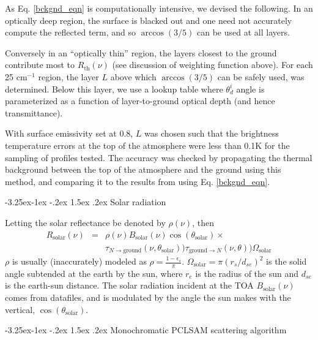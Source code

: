 \documentclass[11pt]{article}
\makeatletter
\newcommand{\wn}{cm$^{-1}$\xspace}
\renewcommand{\subsection}{\@startsection{subsection}{2}{\z@}%
                                     {-3.25ex\@plus -1ex \@minus -.2ex}%
                                     {1.5ex \@plus .2ex}%
                                     {\reset@font\normalsize\bfseries}}
\makeatother
\begin{document}
As Eq. \ref{bckgnd_eqn} is computationally intensive, we devised the
following.  In an optically deep region, the surface is blacked out
and one need not accurately compute the reflected term, and so
$\arccos(3/5)$ can be used at all layers.

Conversely in an ``optically thin'' region, the layers closest to the
ground contribute most to $R_{\text{th}}(\nu)$ (see discussion of
weighting function above).  For each 25 \wn region, the layer $L$
above which $\arccos(3/5)$ can be safely used, was determined. Below
this layer, we use a lookup table where $\theta^{i}_{d}$ angle is
parameterized as a function of layer-to-ground optical depth (and
hence transmittance).

With surface emissivity set at 0.8, $L$ was chosen such that the
brightness temperature errors at the top of the atmosphere were less
than 0.1K for the sampling of profiles tested. The accuracy was
checked by propagating the thermal background between the top of the
atmosphere and the ground using this method, and comparing it to the
results from using Eq. \ref{bckgnd_eqn}.

\subsection{Solar radiation}

Letting the solar reflectance be denoted by $\rho(\nu)$, then
\begin{eqnarray*}
  R_{\text{solar}}(\nu) & = & \rho(\nu) B_{\text{solar}}(\nu) \cos(\theta_{\text{solar}}) \times \\
  & &                 \tau_{N \rightarrow \text{ground}}(\nu,\theta_{\text{solar}}))
  \tau_{\text{ground} \rightarrow N}(\nu,\theta))
  \Omega_{\text{solar}}
\end{eqnarray*}
$\rho$ is usually (inaccurately) modeled as $\rho = \frac{1 -
  \epsilon_{s}}{\pi}$.  $\Omega_{\text{solar}} =
\pi(r_{s}/d_{se})^{2}$ is the solid angle subtended at the earth by
the sun, where $r_{e}$ is the radius of the sun and $d_{se}$ is the
earth-sun distance. The solar radiation incident at the TOA
$B_{\text{solar}}(\nu)$ comes from datafiles, and is modulated by the
angle the sun makes with the vertical, $\cos(\theta_{\text{solar}})$.

\subsection{\textsf{Monochromatic PCLSAM} scattering algorithm}
\end{document}
